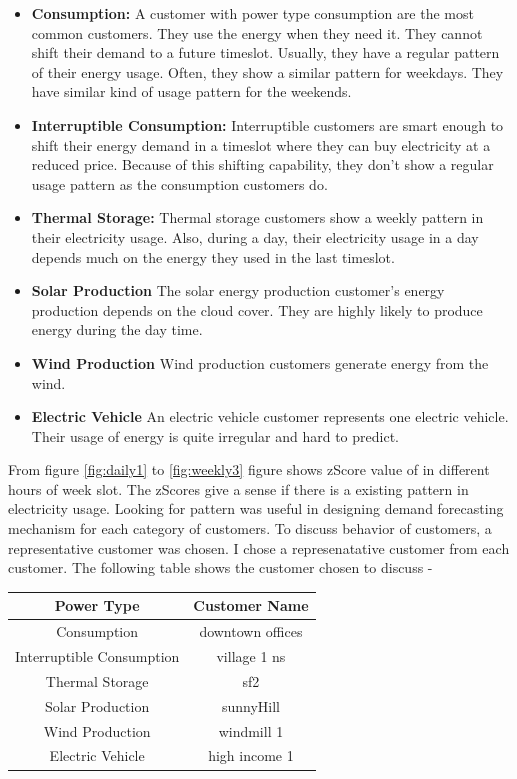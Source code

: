 \begin{itemize}
\item \textbf{Consumption: } A customer with power type consumption are the most common customers. They use the energy when they need it. They cannot shift their demand to a future timeslot. Usually, they have a regular pattern of their energy usage. Often, they show a similar pattern for weekdays. They have similar kind of usage pattern for the weekends. 



\item \textbf{Interruptible Consumption: }
Interruptible customers are smart enough to shift their energy demand in a timeslot where they can buy electricity at a reduced price. Because of this shifting capability, they don't show a regular usage pattern as the consumption customers do. 

\item \textbf{Thermal Storage: }
Thermal storage customers show a weekly pattern in their electricity usage. Also, during a day, their electricity usage in a day depends  much on the energy they used in the last timeslot. 


\item \textbf{Solar Production}
The solar energy production customer's energy production depends on the cloud cover. They are highly likely to produce energy during the day time.

\item\textbf{Wind Production} Wind production customers generate energy from the wind.
\item \textbf{Electric Vehicle} An electric vehicle customer represents one electric vehicle. Their usage of energy is quite irregular and hard to predict.
\end{itemize}

From figure \ref{fig:daily1} to \ref{fig:weekly3} figure shows zScore value of in different hours of week slot. The zScores give a sense if there is a existing pattern in electricity usage. Looking for pattern was useful in designing demand forecasting mechanism for each category of customers. To discuss behavior of customers, a representative customer was chosen. I chose a represenatative customer from each customer. The following table shows the customer chosen to discuss -
\begin{center}
\begin{tabular}{ |c|c| } 
\hline
Power Type & Customer Name \\
\hline
Consumption & downtown offices \\ 
Interruptible Consumption & village 1 ns \\ 
Thermal Storage & sf2 \\ 
Solar Production & sunnyHill \\ 
Wind Production & windmill 1 \\ 
Electric Vehicle & high income 1 \\ 
\hline
\end{tabular}
\end{center}

